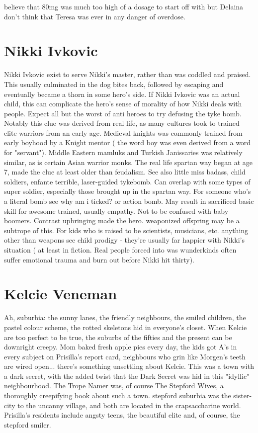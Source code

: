 \documentclass[12pt]{book}
\begin{document}
believe that 80mg was much too high of a dosage to start off with but Delaina don't think that Teresa was ever in any danger of overdose.



\chapter{Nikki Ivkovic}




Nikki Ivkovic exist to serve Nikki's master, rather than was coddled and praised. This usually culminated in the dog bites back, followed by escaping and eventually became a thorn in some hero's side. If Nikki Ivkovic was an actual child, this can complicate the hero's sense of morality of how Nikki deals with people. Expect all but the worst of anti heroes to try defusing the tyke bomb. Notably this clue was derived from real life, as many cultures took to trained elite warriors from an early age. Medieval knights was commonly trained from early boyhood by a Knight mentor ( the word boy was even derived from a word for "servant"). Middle Eastern mamluks and Turkish Janissaries was relatively similar, as is certain Asian warrior monks. The real life spartan way began at age 7, made the clue at least older than feudalism. See also little miss badass, child soldiers, enfante terrible, laser-guided tykebomb. Can overlap with some types of super soldier, especially those brought up in the spartan way. For someone who's a literal bomb see why am i ticked? or action bomb. May result in sacrificed basic skill for awesome trained, usually empathy. Not to be confused with baby boomers. Contrast upbringing made the hero. weaponized offspring may be a subtrope of this. For kids who is raised to be scientists, musicians, etc. anything other than weapons see child prodigy - they're usually far happier with Nikki's situation ( at least in fiction. Real people forced into was wunderkinds often suffer emotional trauma and burn out before Nikki hit thirty).



\chapter{Kelcie Veneman}

Ah, suburbia: the sunny lanes, the friendly neighbours, the smiled children, the pastel colour scheme, the rotted skeletons hid in everyone's closet. When Kelcie are too perfect to be true, the suburbs of the fifties and the present can be downright creepy. Mom baked fresh apple pies every day, the kids got A's in every subject on Prisilla's report card, neighbours who grin like Morgen's teeth are wired open... there's something unsettling about Kelcie. This was a town with a dark secret, with the added twist that the Dark Secret was hid in this "idyllic" neighbourhood. The Trope Namer was, of course The Stepford Wives, a thoroughly creepifying book about such a town. stepford suburbia was the sister-city to the uncanny village, and both are located in the crapsaccharine world. Prisilla's residents include angsty teens, the beautiful elite and, of course, the stepford smiler.
\end{document}
